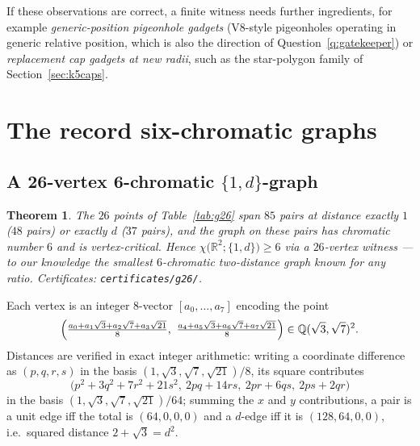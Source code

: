 \documentclass[11pt]{article}
\newtheorem{theorem}{Theorem}[section]
\theoremstyle{definition}
\theoremstyle{remark}
\newcommand{\R}{\mathbb{R}}
\newcommand{\Q}{\mathbb{Q}}
\newcommand{\dd}{d}                          %
\newcommand{\chid}[1]{\chi\bigl(\R^2;#1\bigr)}
\begin{document}
If these observations are correct, a finite witness needs further
ingredients, for example \emph{generic-position pigeonhole gadgets}
(V8-style pigeonholes operating in generic relative position, which is
also the direction of Question~\ref{q:gatekeeper}) or \emph{replacement
cap gadgets at new radii}, such as the star-polygon family of
Section~\ref{sec:k5caps}.

\section{The record six-chromatic graphs}\label{sec:record}

\subsection{A 26-vertex 6-chromatic $\{1,\dd\}$-graph}\label{sec:g26}

\begin{theorem}\label{thm:g26}
The $26$ points of Table~\ref{tab:g26} span $85$ pairs at distance
exactly $1$ ($48$ pairs) or exactly $\dd$ ($37$ pairs), and the graph on
these pairs has chromatic number $6$ and is vertex-critical.  Hence
$\chid{\{1,\dd\}}\ge6$ via a $26$-vertex witness --- to our knowledge
the smallest $6$-chromatic two-distance graph known for any ratio.
Certificates: \texttt{certificates/g26/}.
\end{theorem}

Each vertex is an integer $8$-vector $[a_0,\dots,a_7]$ encoding the point
\[
  \Bigl(\tfrac{a_0+a_1\sqrt3+a_2\sqrt7+a_3\sqrt{21}}{8},\
        \tfrac{a_4+a_5\sqrt3+a_6\sqrt7+a_7\sqrt{21}}{8}\Bigr)
  \in \Q(\sqrt3,\sqrt7)^2 .
\]
Distances are verified in exact integer arithmetic: writing a coordinate
difference as $(p,q,r,s)$ in the basis $(1,\sqrt3,\sqrt7,\sqrt{21})/8$,
its square contributes
\[
  \bigl(p^2+3q^2+7r^2+21s^2,\ 2pq+14rs,\ 2pr+6qs,\ 2ps+2qr\bigr)
\]
in the basis $(1,\sqrt3,\sqrt7,\sqrt{21})/64$; summing the $x$ and $y$
contributions, a pair is a unit edge iff the total is $(64,0,0,0)$ and a
$\dd$-edge iff it is $(128,64,0,0)$, i.e.\ squared distance
$2+\sqrt3=\dd^2$.
\end{document}
